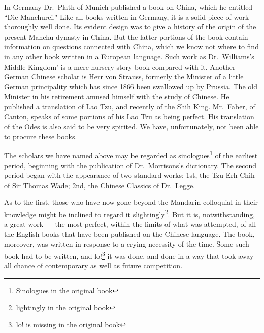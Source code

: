 In Germany Dr.~Plath  of Munich published a book on China, which he entitled ``Die Manchurei."
Like all books written in Germany, it is a solid piece of work thoroughly well done.
Its evident design was to give a history of the origin of the present Manchu dynasty in China.
But the latter portions of the book contain information on questions connected with China, which we know not where to find in any other book written in a European language.
Such work as Dr.~Williams's  Middle Kingdom'  is a mere nursery story-book compared with it.
Another German Chinese scholar is Herr von Strauss,  formerly the Minister of a little German principality which has since 1866 been swallowed up by Prussia.
The old Minister in his retirement amused himself with the study of Chinese.
He published a translation of Lao Tzu,  and recently of the Shih King. 
Mr.~Faber,  of Canton,  speaks of some portions of his Lao Tzu as being perfect.
His translation of the Odes is also said to be very spirited.
We have, unfortunately, not been able to procure these books.

The scholars we have named above may be regarded as sinologues\footnote{Sinologues in the original book} of the earliest period, beginning with the publication of Dr.~Morrisons's dictionary.
The second period began with the appearance of two standard works: 1st, the Tzu Erh Chih  of Sir Thomas Wade;  2nd, the Chinese Classics of Dr.~Legge. 

As to the first, those who have now gone beyond the Mandarin colloquial in their knowledge might be inclined to regard it slightingly\footnote{lightingly in the original book}.
But it is, notwithstanding, a great work --- the most perfect, within the limits of what was attempted, of all the English books that have been published on the Chinese language.
The book, moreover, was written in response to a crying necessity of the time.
Some such book had to be written, and lo!\footnote{lo! is missing in the original book}  it was done, and done in a way that took away all chance of contemporary as well as future competition.

